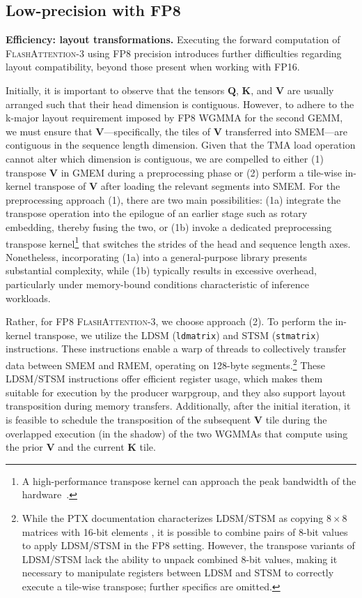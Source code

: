 \subsection{Low-precision with FP8}
\label{sec:algofp8}

\textbf{Efficiency: layout transformations.} Executing the forward computation of \textsc{FlashAttention-3} using FP8 precision introduces further difficulties regarding layout compatibility, beyond those present when working with FP16.

Initially, it is important to observe that the tensors $\mathbf{Q}$, $\mathbf{K}$, and $\mathbf{V}$ are usually arranged such that their head dimension is contiguous. However, to adhere to the k-major layout requirement imposed by FP8 WGMMA for the second GEMM, we must ensure that $\mathbf{V}$—specifically, the tiles of $\mathbf{V}$ transferred into SMEM—are contiguous in the sequence length dimension. Given that the TMA load operation cannot alter which dimension is contiguous, we are compelled to either (1) transpose $\mathbf{V}$ in GMEM during a preprocessing phase or (2) perform a tile-wise in-kernel transpose of $\mathbf{V}$ after loading the relevant segments into SMEM. For the preprocessing approach (1), there are two main possibilities: (1a) integrate the transpose operation into the epilogue of an earlier stage such as rotary embedding, thereby fusing the two, or (1b) invoke a dedicated preprocessing transpose kernel\footnote{A high-performance transpose kernel can approach the peak bandwidth of the hardware~\citep{colfax_cutlass_transpose_2024}.} that switches the strides of the head and sequence length axes. Nonetheless, incorporating (1a) into a general-purpose library presents substantial complexity, while (1b) typically results in excessive overhead, particularly under memory-bound conditions characteristic of inference workloads.

Rather, for FP8 \textsc{FlashAttention-3}, we choose approach (2). To perform the in-kernel transpose, we utilize the LDSM (\verb|ldmatrix|) and STSM (\verb|stmatrix|) instructions. These instructions enable a warp of threads to collectively transfer data between SMEM and RMEM, operating on 128-byte segments.\footnote{While the PTX documentation characterizes LDSM/STSM as copying $8 \times 8$ matrices with 16-bit elements \cite[\S 9.7.13.4.15-16]{ptx}, it is possible to combine pairs of 8-bit values to apply LDSM/STSM in the FP8 setting. However, the transpose variants of LDSM/STSM lack the ability to unpack combined 8-bit values, making it necessary to manipulate registers between LDSM and STSM to correctly execute a tile-wise transpose; further specifics are omitted.} These LDSM/STSM instructions offer efficient register usage, which makes them suitable for execution by the producer warpgroup, and they also support layout transposition during memory transfers. Additionally, after the initial iteration, it is feasible to schedule the transposition of the subsequent $\mathbf{V}$ tile during the overlapped execution (in the shadow) of the two WGMMAs that compute using the prior $\mathbf{V}$ and the current $\mathbf{K}$ tile.

